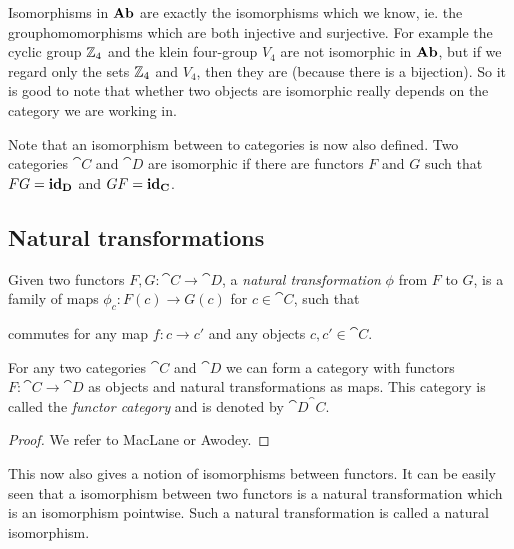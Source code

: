 Isomorphisms in $\mathbf{Ab}$ are exactly the isomorphisms which we know, ie. the grouphomomorphisms which are both injective and surjective.
For example the cyclic group $\mathbb{Z}_4$ and the klein four-group $V_4$ are not isomorphic in $\mathbf{Ab}$, but if we regard only the sets $\mathbb{Z}_4$ and $V_4$, then they are (because there is a bijection). So it is good to note that whether two objects are isomorphic  really depends on the category we are working in.

Note that an isomorphism between to categories is now also defined. Two categories $\cat{C}$ and $\cat{D}$ are isomorphic if there are functors $F$ and $G$ such that $ FG = \mathbf{id}_{\mathbf{D}}$ and $GF = \mathbf{id}_{\mathbf{C}}$.

\subsection{Natural transformations}

\begin{definition}
	Given two functors $F, G: \cat{C} \to \cat{D}$, a \emph{natural transformation} $\phi$ from $F$ to $G$, is a family of maps $\phi_c : F(c) \to G(c)$ for $c \in \cat{C}$, such that
	\begin{center}
	\end{center}
	commutes for any map $f: c \to c'$ and any objects $c, c' \in \cat{C}$.
\end{definition}

\begin{lemma}
	For any two categories $\cat{C}$ and $\cat{D}$ we can form a category with functors $F: \cat{C} \to \cat{D}$ as objects and natural transformations as maps. This category is called the \emph{functor category} and is denoted by $\cat{D}^\cat{C}$.
\end{lemma}
\begin{proof}
	We refer to MacLane or Awodey.
\end{proof}

This now also gives a notion of isomorphisms between functors. It can be easily seen that a isomorphism between two functors is a natural transformation which is an isomorphism pointwise. Such a natural transformation is called a natural isomorphism.


